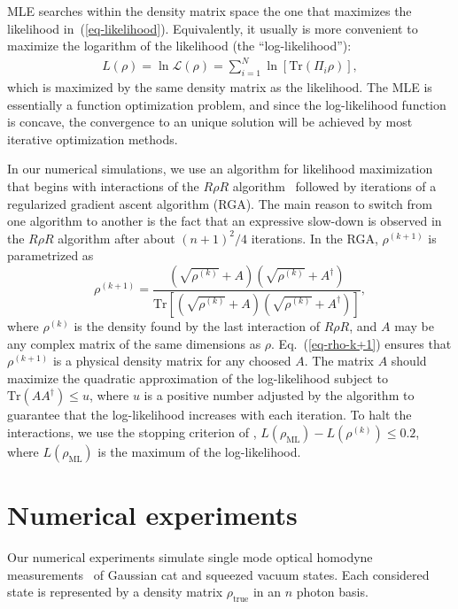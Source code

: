 \documentclass[
reprint,
superscriptaddress,
showpacs,
amsmath,
amssymb,
aps,
pra,
longbibliography
]{revtex4-1}
\begin{document}
MLE searches within the density matrix space the one that maximizes the likelihood in~(\ref{eq-likelihood}). Equivalently, it usually is more convenient to maximize the logarithm of the likelihood (the ``log-likelihood''):
\begin{eqnarray}
L (\rho) = \ln \mathcal{L} (\rho)= \sum_{i=1}^{N} \ln [\mathrm{Tr} (\Pi_i \rho)],
\end{eqnarray} 
which is maximized by the same density matrix as the likelihood. The MLE is essentially a function optimization problem, and since the log-likelihood function is concave, the convergence to an unique solution will be achieved by most iterative optimization methods.

In our numerical simulations, we use an algorithm for likelihood maximization that begins with interactions of the $R\rho R$ algorithm~\cite{Rehacek2007} followed by iterations of a regularized gradient ascent algorithm (RGA). The main reason to switch from one algorithm to another is the fact that an expressive slow-down is observed in the $R\rho R$ algorithm after about $(n+1)^2/4$ iterations. In the RGA, $\rho^{(k+1)}$ is parametrized as 
\begin{equation}
  \rho^{(k+1)}=\frac{\left(\sqrt{\rho^{(k)}}+A\right)\left(\sqrt{\rho^{(k)}}+A^{\dagger}\right)}{\mathrm{Tr}\left[\left(\sqrt{\rho^{(k)}}+A\right)\left(\sqrt{\rho^{(k)}}+A^{\dagger}\right)\right]},
\label{eq-rho-k+1}
\end{equation}
where $\rho^{(k)}$ is the density found by the last interaction of $R \rho R$, and $A$ may be any complex matrix of the same dimensions as $\rho$. Eq.~(\ref{eq-rho-k+1}) ensures that $\rho^{(k+1)}$ is a physical density matrix for any choosed $A$. The matrix $A$ should maximize the quadratic
approximation of the log-likelihood subject to $\text{Tr}(AA^{\dagger})\leq u$, where $u$ is a positive number adjusted by the algorithm to guarantee that the log-likelihood increases with
each iteration. To halt the interactions, we use the stopping criterion of \cite{Glancy2012}, $L(\rho_{\text{ML}})-L(\rho^{(k)})\leq 0.2$, where $L(\rho_{\text{ML}})$ is the maximum of the log-likelihood.


\section{Numerical experiments}
\label{numerical-experiments}
Our numerical experiments simulate single mode optical homodyne
measurements~\cite{Lvovsky2009} of Gaussian cat and squeezed vacuum states. 
Each considered state is represented by a density matrix $\rho_{\mathrm{true}}$ in an $n$ photon basis. 
\end{document}
